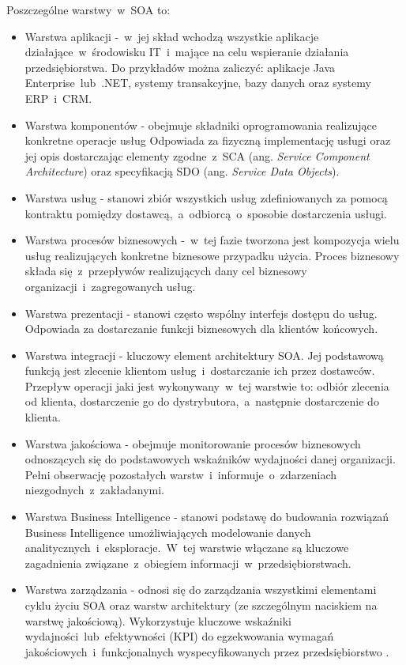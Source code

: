 Poszczególne warstwy~w~SOA to:
\begin{itemize}
\item{Warstwa aplikacji -~w~jej skład wchodzą wszystkie aplikacje działające~w~środowisku IT~i~mające na celu wspieranie działania przedsiębiorstwa. Do przykładów można zaliczyć: aplikacje Java Enterprise~lub~.NET, systemy transakcyjne, bazy danych oraz systemy ERP~i~CRM.}
\item{Warstwa komponentów - obejmuje składniki oprogramowania realizujące konkretne operacje usług Odpowiada za fizyczną implementację usługi oraz jej opis dostarczając elementy zgodne~z~SCA (ang. \textit{Service Component Architecture}) oraz specyfikacją SDO (ang. \textit{Service Data Objects}).}
\item{Warstwa usług - stanowi zbiór wszystkich usług zdefiniowanych za pomocą kontraktu pomiędzy dostawcą,~a~odbiorcą~o~sposobie dostarczenia usługi.}
\item{Warstwa procesów biznesowych -~w~tej fazie tworzona jest kompozycja wielu usług realizujących konkretne biznesowe przypadku użycia. Proces biznesowy składa się~z~przepływów realizujących dany cel biznesowy organizacji~i~zagregowanych usług.}
\item{Warstwa prezentacji - stanowi często wspólny interfejs dostępu do usług. Odpowiada za dostarczanie funkcji biznesowych dla klientów końcowych.}
\item{Warstwa integracji - kluczowy element architektury SOA. Jej podstawową funkcją jest zlecenie klientom usług~i~dostarczanie ich przez dostawców. Przepływ operacji jaki jest wykonywany~w~tej warstwie to: odbiór zlecenia od klienta, dostarczenie go do dystrybutora,~a~następnie dostarczenie do klienta.}
\item{Warstwa jakościowa - obejmuje monitorowanie procesów biznesowych odnoszących się do podstawowych wskaźników wydajności danej organizacji. Pełni obserwację pozostałych warstw~i~informuje~o~zdarzeniach niezgodnych~z~zakładanymi.}
\item{Warstwa Business Intelligence - stanowi podstawę do budowania rozwiązań Business Intelligence umożliwiających modelowanie danych analitycznych~i~eksploracje.~W~tej warstwie włączane są kluczowe zagadnienia związane~z~obiegiem informacji~w~przedsiębiorstwach.}
\item{Warstwa zarządzania - odnosi się do zarządzania wszystkimi elementami cyklu życiu SOA oraz warstw architektury (ze szczególnym naciskiem na warstwę jakościową). Wykorzystuje kluczowe wskaźniki wydajności~lub~efektywności (KPI) do egzekwowania wymagań jakościowych~i~funkcjonalnych wyspecyfikowanych przez przedsiębiorstwo \cite{PlatIntGor}.}
\end{itemize}

